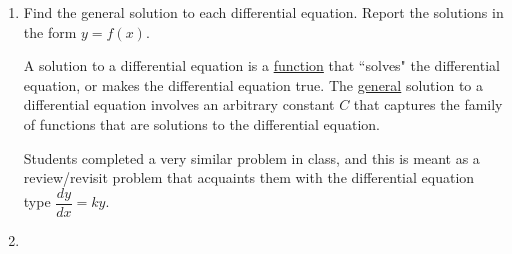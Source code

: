 \documentclass{article}
\begin{document}
\begin{enumerate}
\begin{solution}
\end{solution}

  
\pspace{\newpage}
\begin{workshop}
    The purpose of this question is to solidify the idea that a solution to a differential equation is a function. By the end of our second class on differential equations, students should be well acquainted with the differential equations listed in \#4c and \#4d; questions \#4a and \#4b are meant to remind students that we already know how to solve differential equations that are written exclusively in terms of $x$ using our integration skills!
\end{workshop}
\item
Find the general solution to each differential equation. Report the solutions in the form $y=f(x)$.
\begin{framed}
    A solution to a differential equation is a \underline{function} that ``solves" the differential equation, or makes the differential equation true. The \underline{general} solution to a differential equation involves an arbitrary constant $C$ that captures the family of functions that are solutions to the differential equation. 
\end{framed}
\begin{enumerate} 
      \pspace{0.5in}
\end{enumerate}
\begin{workshop}
Students completed a very similar problem in class, and this is meant as a review/revisit problem that acquaints them with the differential equation type $\dfrac{dy}{dx}=ky$.
\end{workshop}
\item  


\end{enumerate}
\end{document}
